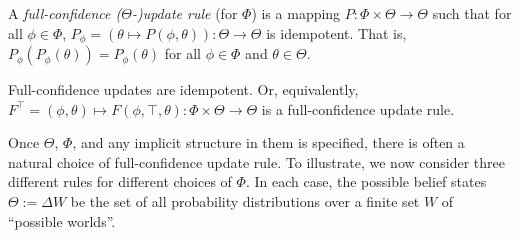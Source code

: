 \begin{defn}
	A \emph{full-confidence ($\Theta$-)update rule} (for $\Phi$) is
	a mapping $P: \Phi \times \Theta \to \Theta$ such that
	for all $\phi \in \Phi$, 
	$P_\phi = (\theta \mapsto P(\phi,\theta)): \Theta \to \Theta$ is idempotent.
	That is,	
	$P_\phi(P_\phi(\theta)) = P_\phi(\theta)$
	 for all $\phi\in\Phi$ and $\theta \in \Theta$.
\end{defn}


\begin{CFaxioms}
	\item
	Full-confidence updates are idempotent. Or,
	equivalently,
	$F^\top = (\phi, \theta) \mapsto F(\phi,\top,\theta): \Phi \times \Theta \to \Theta$ is a full-confidence
	update rule.
	\label{ax:idemp}
\end{CFaxioms}


Once $\Theta$, $\Phi$, and any implicit structure in them is specified, there is often a natural choice of full-confidence update rule.
To illustrate, we now consider three different rules for different choices of $\Phi$.
In each case, the possible belief states $\Theta := \Delta W$ be the set of all probability distributions over a finite set
 $W
  $ of ``possible worlds''.

